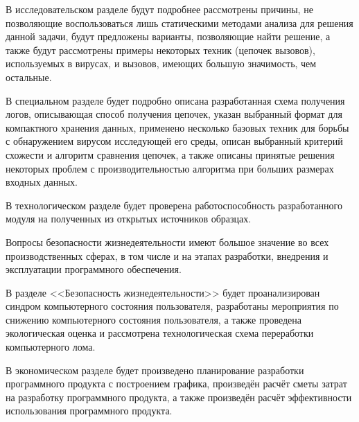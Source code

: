 В исследовательском разделе будут подробнее рассмотрены причины, не позволяющие воспользоваться лишь статическими методами анализа для решения данной задачи, будут предложены варианты, позволяющие найти решение, а также будут рассмотрены примеры некоторых техник (цепочек вызовов), используемых в вирусах, и вызовов, имеющих большую значимость, чем остальные.

В специальном разделе будет подробно описана разработанная схема получения логов, описывающая способ получения цепочек, указан выбранный формат для компактного хранения данных, применено несколько базовых техник для борьбы с обнаружением вирусом исследующей его среды, описан выбранный критерий схожести и алгоритм сравнения цепочек, а также описаны принятые решения некоторых проблем с производительностью алгоритма при больших размерах входных данных.

В технологическом разделе будет проверена работоспособность разработанного модуля на полученных из открытых источников образцах.

Вопросы безопасности жизнедеятельности имеют большое значение во всех производственных сферах, в том числе и на этапах разработки, внедрения и эксплуатации программного обеспечения.

В разделе <<Безопасность жизнедеятельности>> будет проанализирован синдром компьютерного состояния пользователя, разработаны мероприятия по снижению компьютерного состояния пользователя, а также проведена экологическая оценка и рассмотрена технологическая схема переработки компьютерного лома.

В экономическом разделе будет произведено планирование разработки программного продукта с построением графика, произведён расчёт сметы затрат на разработку программного продукта, а также произведён расчёт эффективности использования программного продукта.